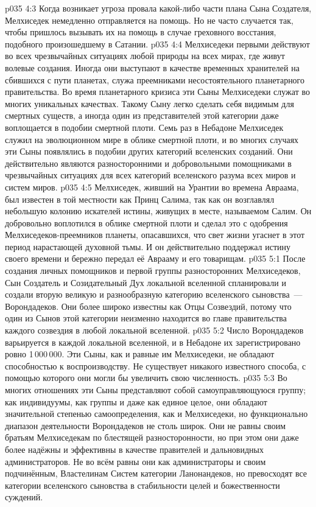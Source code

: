 \vs p035 4:3 Когда возникает угроза провала какой\hyp{}либо части плана Сына Создателя, Мелхиседек немедленно отправляется на помощь. Но не часто случается так, чтобы пришлось вызывать их на помощь в случае греховного восстания, подобного произошедшему в Сатании.
\vs p035 4:4 Мелхиседеки первыми действуют во всех чрезвычайных ситуациях любой природы на всех мирах, где живут волевые создания. Иногда они выступают в качестве временных хранителей на сбившихся с пути планетах, служа преемниками несостоятельного планетарного правительства. Во время планетарного кризиса эти Сыны Мелхиседеки служат во многих уникальных качествах. Такому Сыну легко сделать себя видимым для смертных существ, а иногда один из представителей этой категории даже воплощается в подобии смертной плоти. Семь раз в Небадоне Мелхиседек служил на эволюционном мире в облике смертной плоти, и во многих случаях эти Сыны появлялись в подобии других категорий вселенских созданий. Они действительно являются разносторонними и добровольными помощниками в чрезвычайных ситуациях для всех категорий вселенского разума всех миров и систем миров.
\vs p035 4:5 \pc Мелхиседек, живший на Урантии во времена Авраама, был известен в той местности как Принц Салима, так как он возглавлял небольшую колонию искателей истины, живущих в месте, называемом Салим. Он добровольно воплотился в облике смертной плоти и сделал это с одобрения Мелхиседеков\hyp{}преемников планеты, опасавшихся, что свет жизни угаснет в этот период нарастающей духовной тьмы. И он действительно поддержал истину своего времени и бережно передал её Аврааму и его товарищам.
\vs p035 5:1 После создания личных помощников и первой группы разносторонних Мелхиседеков, Сын Создатель и Созидательный Дух локальной вселенной спланировали и создали вторую великую и разнообразную категорию вселенского сыновства~--- Ворондадеков. Они более широко известны как Отцы Созвездий, потому что один из Сынов этой категории неизменно находится во главе правительства каждого созвездия в любой локальной вселенной.
\vs p035 5:2 \pc Число Ворондадеков варьируется в каждой локальной вселенной, и в Небадоне их зарегистрировано ровно 1\,000\,000. Эти Сыны, как и равные им Мелхиседеки, не обладают способностью к воспроизводству. Не существует никакого известного способа, с помощью которого они могли бы увеличить свою численность.
\vs p035 5:3 \pc Во многих отношениях эти Сыны представляют собой самоуправляющуюся группу; как индивидуумы, как группы и даже как единое целое, они обладают значительной степенью самоопределения, как и Мелхиседеки, но функционально диапазон деятельности Ворондадеков не столь широк. Они не равны своим братьям Мелхиседекам по блестящей разносторонности, но при этом они даже более надёжны и эффективны в качестве правителей и дальновидных администраторов. Не во всём равны они как администраторы и своим подчинённым, Властелинам Систем категории Ланонандеков, но превосходят все категории вселенского сыновства в стабильности целей и божественности суждений.
